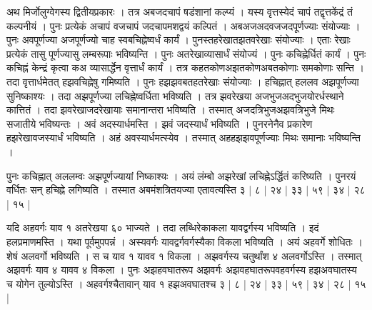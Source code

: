 \documentclass[11pt,a5paper]{book}
\begin{document}
{अथ मिर्जोलुग्वेगस्य द्वितीयप्रकारः । तत्र अबजदचापं षडंशानां कल्प्यं ।
यस्य वृत्तस्येदं चापं तद्वृत्तकेंद्रं तं कल्पनीयं । पुनः प्रत्येकं अचापं वजचापं जदचापमशद्वयं कल्पितं ।
अबअजअदवजजदपूर्णज्याः संयोज्याः । पुनः 
अवपूर्णज्या अजपूर्णज्यो चाह स्वबचिह्नेष्वर्धं कार्यं । पुनस्तहरेखातझतवरेखाः संयोज्याः । एताः रेखाः प्रत्येकं तासु पूर्णज्यासु लम्बरूपाः भविष्यन्ति । पुनः अतरेखाव्यासार्धं संयोज्यं । पुनः कचिह्नेर्धितं कार्यं । पुनः कचिह्नं केन्द्रं कृत्वा
कअ व्यासार्द्धेन वृत्तार्धं कार्यं । तत्र कहतकोणअझतकोणअबतकोणाः समकोणाः सन्ति । तदा वृत्तार्धमेतत् हझवचिह्नेषु गमिष्यति । पुनः हझझवबतहतरेखाः संयोज्याः । हचिह्नात् हललव अझपूर्णज्या सुनिष्काश्यः । 
तदा अझपूर्णज्या लचिह्नेष्वर्धिता भविष्यति । तत्र झवरेखया अजभुजअदभुजयोरर्धस्थाने कात्तितं । तदा झवरेखाजदरेखायाः समानान्तरा भविष्यति । तस्मात् अजदत्रिभुजअझवत्रिभुजे मिथः सजातीये भविष्यन्तः । अवं अदस्यार्धमस्ति ।  झवं जदस्यार्धं भविष्यति । 
पुनरनेनैव प्रकारेण हझरेखावजस्यार्धं भविष्यति । अहं अवस्यार्धमत्स्येव । तस्मात् अहहझझवपूर्णज्याः मिथः समानाः भविष्यन्ति । 




पुनः कचिह्नात् अललम्वः अझपूर्णज्यायां निष्काश्यः । अयं लंम्बो अझरेखां लचिह्नेऽर्द्धितं करिष्यति । 
पुनरयं वर्धितः सन् हचिह्ने लगिष्यति । तस्मात अबमंशत्रितयज्या एतावत्यस्ति ३ | ८ | २४ | ३३ | ५९ | ३४ | २८ | १५ | 

यदि अहवर्गः याव १ अतरेखया ६० भाज्यते । तदा लब्धिरेकाकला यावद्वर्गस्य भविष्यति । इदं हलप्रमाणमस्ति । यथा पूर्वमुपपन्नं । अस्यवर्गः यावद्वर्गवर्गस्यैका  
विकला भविष्यति । अयं अहवर्गे शोधितः । शेषं अलवर्गो भविष्यति । स च याव १ यावव १ विकला । अझवर्गस्य चतुर्थांश ४ 
अलवर्गोऽस्ति । तस्मात् अझवर्गः याव ४ यावव ४ विकला । पुनः अझहवघातरूप
अझवर्गः अझवहघातरूपवहवर्गस्य हझअवघातस्य च योगेन तुल्योऽस्ति ।
अहवर्गश्चैतावान् याव १ हझअवघातश्च ३ | ८ | २४ | ३३ | ५९ | ३४ | २८ | १५ |  





}
\end{document}
